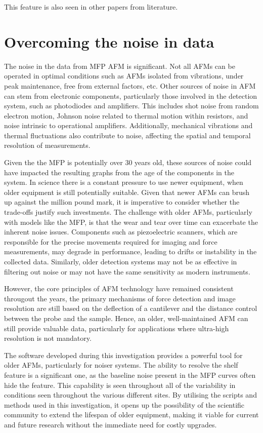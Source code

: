 This feature is also seen in other papers from literature.\cite{guleryuz2012afm}

\section{Overcoming the noise in data}

The noise in the data from MFP AFM is significant. Not all AFMs can be operated in optimal conditions such as AFMs isolated from vibrations, under peak maintenance, free from external factors, etc. Other sources of noise in AFM can stem from electronic components, particularly those involved in the detection system, such as photodiodes and amplifiers. This includes shot noise from random electron motion, Johnson noise related to thermal motion within resistors, and noise intrinsic to operational amplifiers. Additionally, mechanical vibrations and thermal fluctuations also contribute to noise, affecting the spatial and temporal resolution of measurements. \cite{gittes1997signals}

Given the the MFP is potentially over 30 years old, these sources of noise could have impacted the resulting graphs from the age of the components in the system. In science there is a constant pressure to use newer equipment, when older equipment is still potentially suitable. Given that newer AFMs can brush up against the million pound mark, it is imperative to consider whether the trade-offs justify such investments. The challenge with older AFMs, particularly with models like the MFP, is that the wear and tear over time can exacerbate the inherent noise issues. Components such as piezoelectric scanners, which are responsible for the precise movements required for imaging and force measurements, may degrade in performance, leading to drifts or instability in the collected data. Similarly, older detection systems may not be as effective in filtering out noise or may not have the same sensitivity as modern instruments.

However, the core principles of AFM technology have remained consistent througout the years, the primary mechanisms of force detection and image resolution are still based on the deflection of a cantilever and the distance control between the probe and the sample. Hence, an older, well-maintained AFM can still provide valuable data, particularly for applications where ultra-high resolution is not mandatory.

The software developed during this investigation provides a powerful tool for older AFMs, particularly for noiser systems. The ability to resolve the shelf feature is a significant one, as the baseline noise present in the MFP curves often hide the feature. This capability is seen throughout all of the variability in conditions seen throughout the various different sites. By utilising the scripts and methods used in this investigation, it opens up the possibility of the scientific community to extend the lifespan of older equipment, making it viable for current and future research without the immediate need for costly upgrades.

